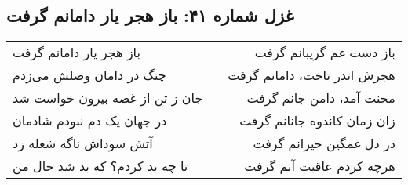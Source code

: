 \begin{center}
\section*{غزل شماره ۴۱: باز هجر یار دامانم گرفت}
\label{sec:041}
\begin{longtable}{l p{0.5cm} r}
باز هجر یار دامانم گرفت
&&
باز دست غم گریبانم گرفت
\\
چنگ در دامان وصلش می‌زدم
&&
هجرش اندر تاخت، دامانم گرفت
\\
جان ز تن از غصه بیرون خواست شد
&&
محنت آمد، دامن جانم گرفت
\\
در جهان یک دم نبودم شادمان
&&
زان زمان کاندوه جانانم گرفت
\\
آتش سوداش ناگه شعله زد
&&
در دل غمگین حیرانم گرفت
\\
تا چه بد کردم؟ که بد شد حال من
&&
هرچه کردم عاقبت آنم گرفت
\\
\end{longtable}
\end{center}
